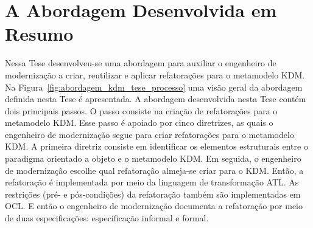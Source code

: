 

\section{A Abordagem Desenvolvida em Resumo}\label{sec:introducao:a_abordagem_desenvolvida}

Nessa Tese desenvolveu-se uma abordagem para auxiliar o engenheiro de modernização a criar, reutilizar e aplicar refatorações para o metamodelo KDM. Na Figura~\ref{fig:abordagem_kdm_tese_processo} uma visão geral da abordagem definida nesta Tese é apresentada. A abordagem desenvolvida nesta Tese contém dois principais passos. O passo  consiste na criação de refatorações para o metamodelo KDM. Esse passo é apoiado por cinco diretrizes, as quais o engenheiro de modernização segue para criar refatorações para o metamodelo KDM. A primeira diretriz consiste em identificar os elementos estruturais entre o paradigma orientado a objeto e o metamodelo KDM. Em seguida, o engenheiro de modernização escolhe qual refatoração almeja-se criar para o KDM. Então, a refatoração é implementada por meio da linguagem de transformação ATL. As restrições (pré- e pós-condições) da refatoração também são implementadas em OCL. E então o engenheiro de modernização documenta a refatoração por meio de duas especificações: especificação informal e formal.





